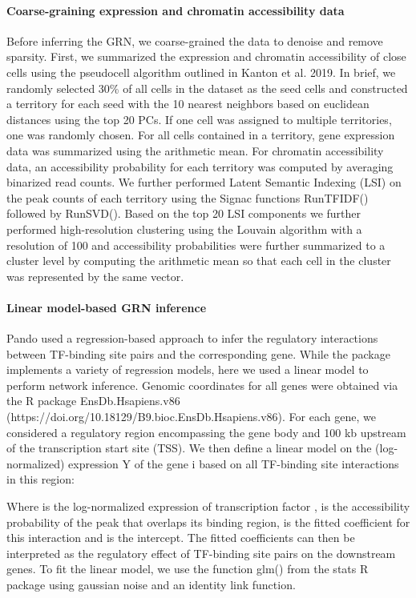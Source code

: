 \paragraph{Coarse-graining expression and chromatin accessibility data}
Before inferring the GRN, we coarse-grained the data to denoise and remove sparsity. First, we summarized the expression and chromatin accessibility of close cells using the pseudocell algorithm outlined in Kanton et al. 2019. In brief, we randomly selected 30\% of all cells in the dataset as the seed cells and constructed a territory for each seed with the 10 nearest neighbors based on euclidean distances using the top 20 PCs. If one cell was assigned to multiple territories, one was randomly chosen. For all cells contained in a territory, gene expression data was summarized using the arithmetic mean. For chromatin accessibility data, an accessibility probability for each territory was computed by averaging binarized read counts. We further performed Latent Semantic Indexing (LSI) on the peak counts of each territory using the Signac functions RunTFIDF() followed by RunSVD(). Based on the top 20 LSI components we further performed high-resolution clustering using the Louvain algorithm with a resolution of 100 and accessibility probabilities were further summarized to a cluster level by computing the arithmetic mean so that each cell in the cluster was represented by the same vector.
 
\paragraph{Linear model-based GRN inference}
Pando used a regression-based approach to infer the regulatory interactions between TF-binding site pairs and the corresponding gene. While the package implements a variety of regression models, here we used a linear model to perform network inference. Genomic coordinates for all genes were obtained via the R package EnsDb.Hsapiens.v86 (https://doi.org/10.18129/B9.bioc.EnsDb.Hsapiens.v86).  For each gene, we considered a regulatory region encompassing the gene body and 100 kb upstream of the transcription start site (TSS). We then define a linear model on the (log-normalized) expression Y of the gene i based on all TF-binding site interactions in this region:

                                    
 
Where is the log-normalized expression of transcription factor , is the accessibility probability of the peak that overlaps its binding region, is the fitted coefficient for this interaction and  is the intercept. The fitted coefficients can then be interpreted as the regulatory effect of TF-binding site pairs on the downstream genes. To fit the linear model, we use the function glm() from the stats R package using gaussian noise and an identity link function.
 
